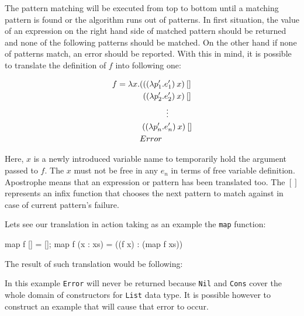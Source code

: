 \documentclass[12pt,a4paper]{report}
\begin{document}
The pattern matching will be executed from top to bottom until a matching
pattern is found or the algorithm runs out of patterns. In first situation, the
value of an expression on the right hand side of matched pattern should be
returned and none of the following patterns should be matched. On the other
hand if none of patterns match, an error should be reported. With this in mind,
it is possible to translate the definition of $f$ into following one:

\vspace{-0.2in}
\begin{align*}
f = \lambda x.(((\lambda p_{1}'&.e_{1}')\:x)\:[] \\
        ((\lambda p_{2}'&.e_{2}')\:x)\:[] \\
                        &\mathrel{\makebox[\widthof{=}]{\vdots}} \\
        ((\lambda p_{n}'&.e_{n}')\:x)\:[] \\
        Error
\end{align*}

Here, $x$ is a newly introduced variable name to temporarily hold the argument
passed to $f$. The $x$ must not be free in any $e_{n}$ in terms of free
variable definition. Apostrophe means that an expression or pattern has been
translated too. The $[]$ represents an infix function that chooses the next
pattern to match against in case of current pattern's failure.

Lets see our translation in action taking as an example the \texttt{map}
function:

\vspace*{0.2in}
\begin{code}[label=lst:map_pattern_matching,style=haskell]
  map f [] = [];
  map f (x : xs) = ((f x) : (map f xs))
\end{code}

The result of such translation would be following:

\vspace*{0.2in}

In this example \texttt{Error} will never be returned because \texttt{Nil} and
\texttt{Cons} cover the whole domain of constructors for \texttt{List} data type.  It
is possible however to construct an example that will cause that error to
occur.
\end{document}
